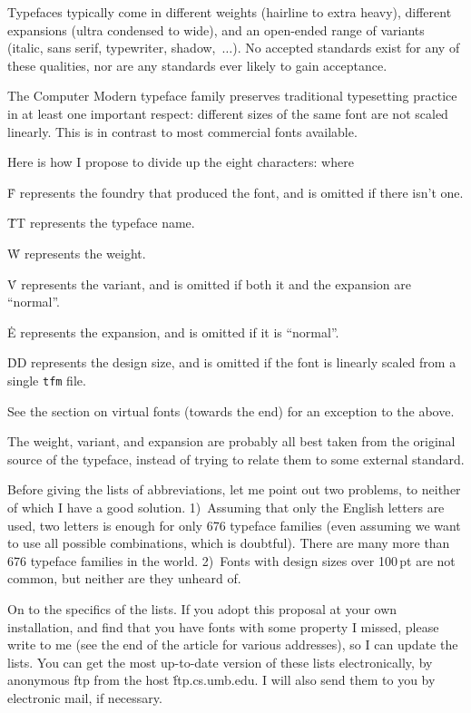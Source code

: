 {\mitem Typefaces typically come in different weights (hairline to extra
heavy), different expansions (ultra condensed to wide), and an
open-ended range of variants (italic, sans serif, typewriter,
shadow,~$\ldots$).  No accepted standards exist for any of these
qualities, nor are any standards ever likely to gain acceptance.

\mitem The Computer Modern typeface family preserves traditional typesetting
practice in at least one important respect: different sizes of the same
font are not scaled linearly.  This is in contrast to most commercial fonts
available.

Here is how I propose to divide up the eight characters:
\noindent
where

\mitem \.{F} represents the foundry that produced the font, and is omitted
if there isn't one.

\mitem \.{TT} represents the typeface name.

\mitem \.W represents the weight.

\mitem \.V represents the variant, and is omitted if both it and the
expansion are ``normal''.

\mitem \.E represents the expansion, and is omitted if it is ``normal''.

\mitem \.{DD} represents the design size, and is omitted if the font is
linearly scaled from a single {\tt tfm} file.

See the section on virtual fonts (towards the end) for an exception to
the above.

The weight, variant, and expansion are probably all best taken from the
original source of the typeface, instead of trying to relate them to
some external standard.

Before giving the lists of abbreviations, let me point out two problems,
to neither of which I have a good solution.  1)~Assuming that only the
English letters are used, two letters is enough for only 676 typeface
families (even assuming we want to use all possible combinations, which
is doubtful).  There are many more than 676 typeface families in the
world.  2)~Fonts with design sizes over 100$\,$pt are not common, but
neither are they unheard of.

On to the specifics of the lists.  If you adopt this proposal at your
own installation, and find that you have fonts with some property I
missed, please write to me (see the end of the article for various
addresses), so I can update the lists.  You can get the
most up-to-date version of these lists electronically, by anonymous ftp
from the host \.{ftp.cs.umb.edu}.  I will also send them to you by
electronic mail, if necessary.

}
